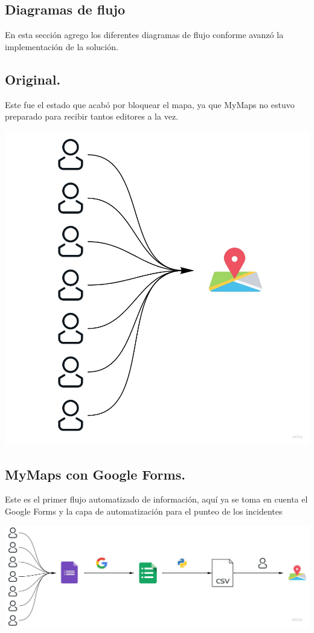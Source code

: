 \documentclass[12pt,spanish,oneside,breaklinks]{book}
\begin{document}
\begin{appendices}
\chapter{Diagramas de flujo}
\label{sec:org6631f26}
En esta sección agrego los diferentes diagramas de flujo conforme avanzó la implementación de la solución.
\section{Original.}
\label{sec:orgc082fc1}
Este fue el estado que acabó por bloquear el mapa, ya que MyMaps no estuvo preparado para recibir tantos editores a la vez.
\begin{center}
\includegraphics[width=.9\linewidth]{./img/original.jpeg}
\end{center}
\section{MyMaps con Google Forms.}
\label{sec:org4483fe6}
Este es el primer flujo automatizado de información, aquí ya se toma en cuenta el Google Forms y la capa de automatización para el punteo de los incidentes
\begin{center}
\includegraphics[width=.9\linewidth]{./img/mymaps.jpeg}
\end{center}


\end{appendices}
\end{document}

